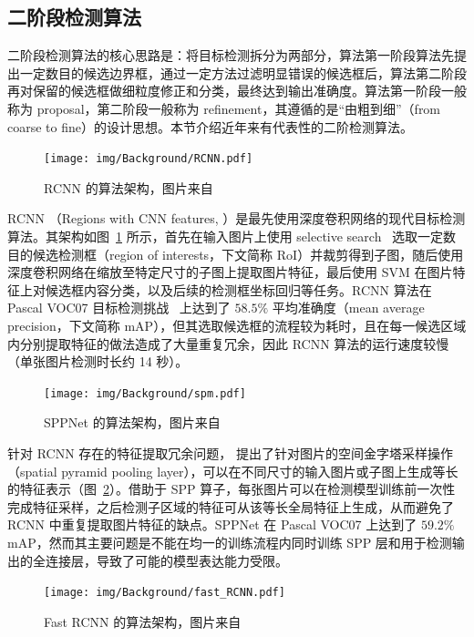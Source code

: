 \documentclass[
  fontset = mac,
]{shtthesis}
\begin{document}
\subsection{二阶段检测算法}
二阶段检测算法的核心思路是：将目标检测拆分为两部分，算法第一阶段算法先提出一定数目的候选边界框，通过一定方法过滤明显错误的候选框后，算法第二阶段再对保留的候选框做细粒度修正和分类，最终达到输出准确度。算法第一阶段一般称为 proposal，第二阶段一般称为 refinement，其遵循的是“由粗到细”（from coarse to fine）的设计思想。本节介绍近年来有代表性的二阶检测算法。

\begin{figure}[htb]
  \centering
  \texttt{[image: img/Background/RCNN.pdf]}
  \caption{RCNN 的算法架构，图片来自~\citet{girshick2015region}}
  \label{img::background::RCNN}
\end{figure}

RCNN （Regions with CNN features, \citet{girshick2015region}）是最先使用深度卷积网络的现代目标检测算法。其架构如图~\ref{img::background::RCNN} 所示，首先在输入图片上使用 selective search~\citep{van2011segmentation} 选取一定数目的候选检测框（region of interests，下文简称 RoI）并裁剪得到子图，随后使用深度卷积网络在缩放至特定尺寸的子图上提取图片特征，最后使用 SVM 在图片特征上对候选框内容分类，以及后续的检测框坐标回归等任务。RCNN 算法在 Pascal VOC07 目标检测挑战~\citep{Everingham10} 上达到了 $58.5\%$ 平均准确度（mean average precision，下文简称 mAP），但其选取候选框的流程较为耗时，且在每一候选区域内分别提取特征的做法造成了大量重复冗余，因此 RCNN 算法的运行速度较慢（单张图片检测时长约 14 秒）。

\begin{figure}[htb]
  \centering
  \texttt{[image: img/Background/spm.pdf]}
  \caption{SPPNet 的算法架构，图片来自~\citet{he2015spatial}}
  \label{img::background::SPPNet}
\end{figure}

针对 RCNN 存在的特征提取冗余问题，\citet{he2015spatial} 提出了针对图片的空间金字塔采样操作（spatial pyramid pooling layer），可以在不同尺寸的输入图片或子图上生成等长的特征表示（图~\ref{img::background::SPPNet}）。借助于 SPP 算子，每张图片可以在检测模型训练前一次性完成特征采样，之后检测子区域的特征可从该等长全局特征上生成，从而避免了 RCNN 中重复提取图片特征的缺点。SPPNet 在 Pascal VOC07 上达到了 $59.2\%$ mAP，然而其主要问题是不能在均一的训练流程内同时训练 SPP 层和用于检测输出的全连接层，导致了可能的模型表达能力受限。

\begin{figure}[htb]
  \centering
  \texttt{[image: img/Background/fast\_RCNN.pdf]}
  \caption{Fast RCNN 的算法架构，图片来自~\citet{girshick2015fast}}
  \label{img::background::fast_RCNN}
\end{figure}
\end{document}
